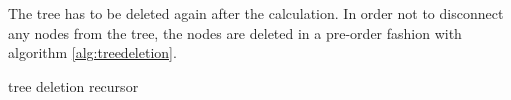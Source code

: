 The tree has to be deleted again after the calculation. In order not to disconnect any nodes from the tree, the nodes are deleted in a pre-order fashion with algorithm \ref{alg:treedeletion}.
\begin{algorithm}
\caption{tree deletion recursor}
\begin{algorithmic}
\label{alg:treedeletion}
\ENDFOR
\end{algorithmic}
\end{algorithm}
